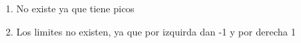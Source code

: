 \documentclass[../practica_04.tex]{subfiles}
\begin{document}
    \begin{enumerate}
        \item No existe ya que tiene picos
        \item Los limites no existen, ya que por izquirda dan -1 y por derecha 1
    \end{enumerate}
\end{document}
